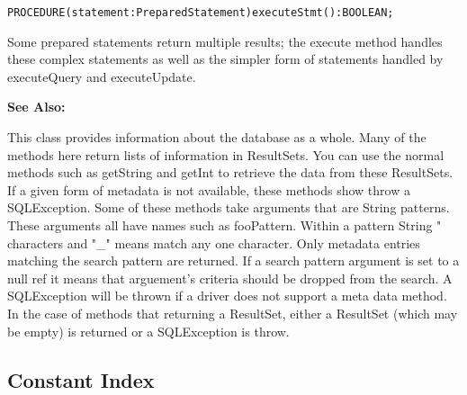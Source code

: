 
\verb'PROCEDURE(statement:PreparedStatement)executeStmt():BOOLEAN;'

Some prepared statements return multiple results; the execute method handles these complex statements as well as the simpler form of statements handled by executeQuery and executeUpdate. 

{\bf See Also:} 


\renewcommand{\CurClass}{DatabaseMetaData}
\Class{}

This class provides information about the database as a whole. 
Many of the methods here return lists of information in ResultSets. 
You can use the normal  methods such as getString and getInt 
to retrieve the data from these ResultSets. If a given form of metadata 
is not available, these methods show throw a SQLException. 
Some of these methods take arguments that are String patterns. 
These arguments all have names such as fooPattern. 
Within a pattern String "%
characters and "_" means match any one character. 
Only metadata entries matching the search pattern are returned. 
If a search pattern argument is set to a null ref it means that 
arguement's criteria should be dropped from the search. 
A SQLException will be thrown if a driver does not support a meta data method. 
In the case of methods that returning a ResultSet, either a 
ResultSet (which may be empty) is returned or a SQLException is throw. 

\subsection{Constant Index}

